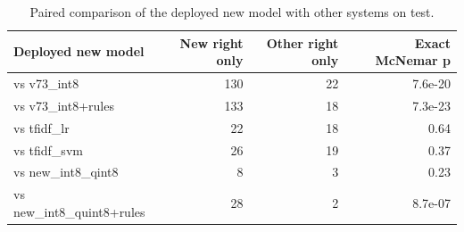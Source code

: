 \begin{table}[t]
\centering
\caption{Paired comparison of the deployed new model with other systems on test.}
\label{tab:mcnemar}
\small
\begin{tabular}{lrrr}
\toprule
Deployed new model & New right only & Other right only & Exact McNemar p \\
\midrule
vs v73_int8 & 130 & 22 & 7.6e-20 \\
vs v73_int8+rules & 133 & 18 & 7.3e-23 \\
vs tfidf_lr & 22 & 18 & 0.64 \\
vs tfidf_svm & 26 & 19 & 0.37 \\
vs new_int8_qint8 & 8 & 3 & 0.23 \\
vs new_int8_quint8+rules & 28 & 2 & 8.7e-07 \\
\bottomrule
\end{tabular}
\end{table}
